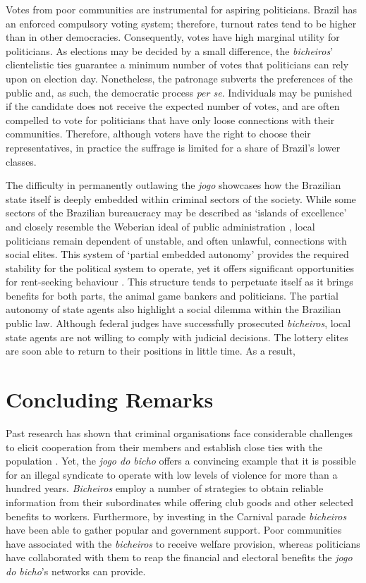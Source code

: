 \documentclass[a4paper,12pt]{article}
\begin{document}
Votes from poor communities are instrumental for aspiring politicians. Brazil has an enforced compulsory voting system; therefore, turnout rates tend to be higher than in other democracies. Consequently, votes have high marginal utility for politicians. As elections may be decided by a small difference, the \emph{bicheiros}' clientelistic ties guarantee a minimum number of votes that politicians can rely upon on election day. Nonetheless, the patronage subverts the preferences of the public and, as such, the democratic process \textit{per se}. Individuals may be punished if the candidate does not receive the expected number of votes, and are often compelled to vote for politicians that have only loose connections with their communities. Therefore, although voters have the right to choose their representatives, in practice the suffrage is limited for a share of Brazil’s lower classes.

The difficulty in permanently outlawing the \textit{jogo} showcases how the Brazilian state itself is deeply embedded within criminal sectors of the society. While some sectors of the Brazilian bureaucracy may be described as `islands of excellence' and closely resemble the Weberian ideal of public administration \citep{bersch2017state}, local politicians remain dependent of unstable, and often unlawful, connections with social elites. This system of `partial embedded autonomy' provides the required stability for the political system to operate, yet it offers significant opportunities for rent-seeking behaviour \cite{evans1995embedded}. This structure tends to perpetuate itself as it brings benefits for both parts, the animal game bankers and politicians. The partial autonomy of state agents also highlight a social dilemma within the Brazilian public law. Although federal judges have successfully prosecuted \textit{bicheiros}, local state agents are not willing to comply with judicial decisions. The lottery elites are soon able to return to their positions in little time. As a result,    

\section{Concluding Remarks}
\label{sec:conclusion3}

Past research has shown that criminal organisations face considerable challenges to elicit cooperation from their members and establish close ties with the population \citep[e.g.][]{gambetta1996sicilian,skarbek2011governance,skarbek2012prison,varese2001russian,varese2011mafias}. Yet, the \textit{jogo do bicho} offers a convincing example that it is possible for an illegal syndicate to operate with low levels of violence for more than a hundred years. \textit{Bicheiros} employ a number of strategies to obtain reliable information from their subordinates while offering club goods and other selected benefits to workers. Furthermore, by investing in the Carnival parade \textit{bicheiros} have been able to gather popular and government support. Poor communities have associated with the \textit{bicheiros} to receive welfare provision, whereas politicians have collaborated with them to reap the financial and electoral benefits the \textit{jogo do bicho}'s networks can provide.
\end{document}
